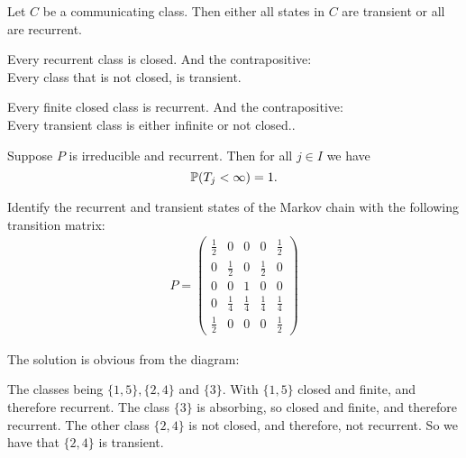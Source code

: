\begin{thm}[Theorem 1.5.4]
Let \(C\) be a communicating class. Then either all states in \(C\) are transient or all are recurrent.
\end{thm}

\begin{thm}[Theorem 1.5.5]
Every recurrent class is closed. And the contrapositive: \\
Every class that is not closed, is transient. 
\end{thm}

\begin{thm}[Theorem 1.5.6]
Every finite closed class is recurrent.
And the contrapositive: \\
Every transient class is either infinite or not closed.. 
\end{thm}

\begin{thm}[Theorem 1.5.7]
Suppose \(P\) is irreducible and recurrent. Then for all \(j\in I\) we have
\[
\Bbb{P}(T_{j}<\infty )=1.
\]
\end{thm}


\begin{thm}[Exercise 1.5.1]
Identify the recurrent and transient states of the Markov chain with the following transition matrix:
\begin{gather*}
P=
\begin{pmatrix}\tfrac{1}{2}&0&0&0&\tfrac{1}{2} \\
0&\tfrac{1}{2}&0&\tfrac{1}{2}&0 \\
0&0&1&0&0\\
0&\tfrac{1}{4}&\tfrac{1}{4}&\tfrac{1}{4}&\tfrac{1}{4} \\
\tfrac{1}{2}& 0&0&0&\tfrac{1}{2}\end{pmatrix}
\end{gather*}
\end{thm}

The solution is obvious from the diagram:


 The classes being \(\{1,5\}, \{2,4\}\) and \(\{3\}\). With  \(\{1,5\}\) closed and finite, and therefore recurrent. The class \(\{3\}\) is absorbing, so closed and finite, and therefore recurrent. The other class $\{2,4\}$ is not closed, and therefore, not recurrent. So we have that $\{2,4\}$ is transient.


